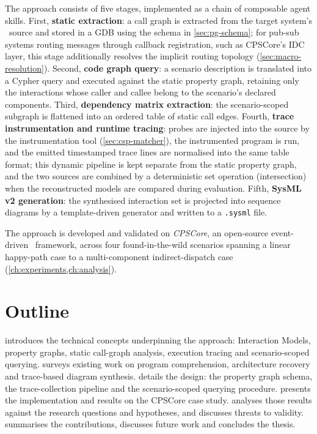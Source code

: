 The approach consists of five stages, implemented as a chain of
composable agent skills. First, \textbf{static extraction}: a call graph
is extracted from the target system's \Cpp\ source and stored in a \neo
\acl{GDB} using the schema in \cref{sec:pg-schema}; for pub-sub systems
routing messages through callback registration, such as CPSCore's IDC
layer, this stage additionally resolves the implicit routing topology
(\cref{sec:macro-resolution}). Second, \textbf{code graph query}: a
scenario description is translated into a Cypher query and executed
against the static property graph, retaining only the interactions whose
caller and callee belong to the scenario's declared components. Third,
\textbf{dependency matrix extraction}: the scenario-scoped subgraph is
flattened into an ordered table of static call edges. Fourth,
\textbf{trace instrumentation and runtime tracing}: probes are injected
into the source by the instrumentation tool (\cref{sec:csp-matcher}), the
instrumented program is run, and the emitted timestamped trace lines are
normalised into the same table format; this dynamic pipeline is kept
separate from the static property graph, and the two sources are
combined by a deterministic set operation (intersection) when the
reconstructed models are compared during evaluation. Fifth, \textbf{SysML v2
generation}: the synthesised
interaction set is projected into \sysml sequence diagrams by a
template-driven generator and written to a \texttt{.sysml} file.

The approach is developed and validated on \emph{CPSCore}, an
open-source event-driven \Cpp\ framework, across four found-in-the-wild
scenarios spanning a linear happy-path case to a multi-component
indirect-dispatch case (\cref{ch:experiments,ch:analysis}).

\section{Outline}

 introduces the technical concepts underpinning the
approach: \sysml Interaction Models, property graphs, static call-graph
analysis, execution tracing and scenario-scoped querying.
 surveys existing work on program comprehension,
architecture recovery and trace-based diagram synthesis. 
details the design: the property graph schema, the trace-collection
pipeline and the scenario-scoped querying procedure. 
presents the implementation and results on the CPSCore case study.
 analyses those results against the research questions
and hypotheses, and discusses threats to validity. 
summarises the contributions, discusses future work and concludes the
thesis.
